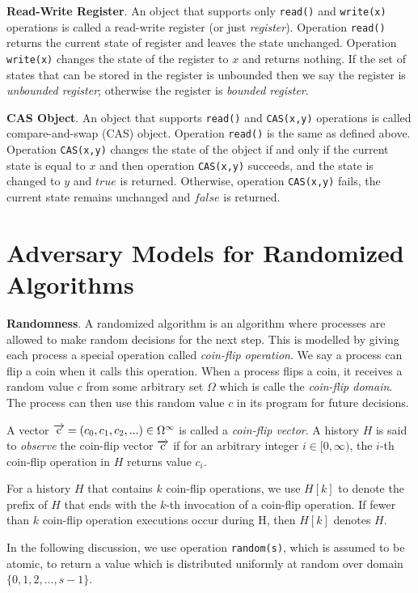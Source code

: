 \textbf{Read-Write Register}.
An object that supports only \texttt{read()} and \texttt{write(x)} operations is called
a read-write register (or just \emph{register}). Operation \texttt{read()} returns the current state of register and
leaves the state unchanged. Operation \texttt{write(x)} changes the state of the register to $x$ and returns nothing.
If the set of states that can be stored in the register is unbounded then we say the register is \emph{unbounded register};
otherwise the register is \emph{bounded register}.

\textbf{CAS Object}. An object that supports \texttt{read()} and \texttt{CAS(x,y)} operations is called compare-and-swap (CAS) object.
Operation \texttt{read()} is the same as defined above. Operation \texttt{CAS(x,y)} changes the state of
the object if and only if the current state is equal to $x$ and then operation \texttt{CAS(x,y)} succeeds, and the state is changed
to $y$ and $true$ is returned. Otherwise, operation \texttt{CAS(x,y)} fails, the current state remains unchanged and
$false$ is returned.

\section{Adversary Models for Randomized Algorithms}

\textbf{Randomness}.
A randomized algorithm is an algorithm where processes are allowed to make random decisions for the next step.
This is modelled by giving each process a special operation called \emph{coin-flip operation}. We say a process can flip a coin
when it calls this operation. When a process flips a coin, it receives a random value $c$ from some arbitrary set $\Omega$
which is calle the \emph{coin-flip domain}. The process can then use this random value $c$ in its program for future decisions.

A vector $\overrightarrow{\rm c} = (c_0, c_1, c_2,...) \in \Omega^{\infty}$ is called a \emph{coin-flip vector}.
A history $H$ is said to \emph{observe} the coin-flip vector $\overrightarrow{\rm c}$ if
for an arbitrary integer $i \in [0, \infty)$, the $i$-th coin-flip operation in $H$ returns value $c_i$.

For a history $H$ that contains $k$ coin-flip operations, we use $H[k]$ to denote the prefix of $H$
that ends with the $k$-th invocation of a coin-flip operation. If fewer than $k$ coin-flip operation
executions occur during H, then $H[k]$ denotes $H$.

In the following discussion, we use operation \texttt{random(s)}, which is assumed
to be atomic, to return a value which is distributed uniformly at random over domain
$\{0, 1, 2,..., s-1\}$.

